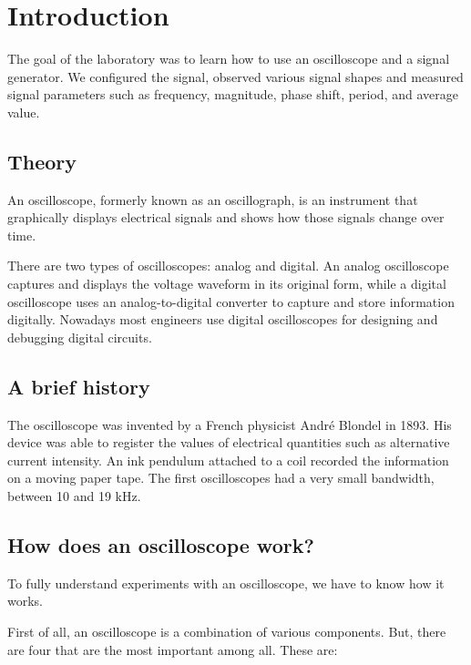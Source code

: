 \section{Introduction}

The goal of the laboratory was to learn how to use an oscilloscope and a signal generator. We configured the signal, observed various signal shapes and measured signal parameters such as frequency, magnitude, phase shift, period, and average value.

\subsection*{Theory}

An oscilloscope, formerly known as an oscillograph, is an instrument that graphically displays electrical signals and shows how those signals change over time.

There are two types of oscilloscopes: analog and digital. An analog oscilloscope captures and displays the voltage waveform in its original form, while a digital oscilloscope uses an analog-to-digital converter to capture and store information digitally. Nowadays most engineers use digital oscilloscopes for designing and debugging digital circuits.

\subsection*{A brief history}

The oscilloscope was invented by a French physicist André Blondel in 1893. His device was able to register the values of electrical quantities such as alternative current intensity. An ink pendulum attached to a coil recorded the information on a moving paper tape. The first oscilloscopes had a very small bandwidth, between 10 and 19 kHz.

\subsection*{How does an oscilloscope work?}

To fully understand experiments with an oscilloscope, we have to know how it works.

First of all, an oscilloscope is a combination of various components. But, there are four that are the most important among all. These are:

